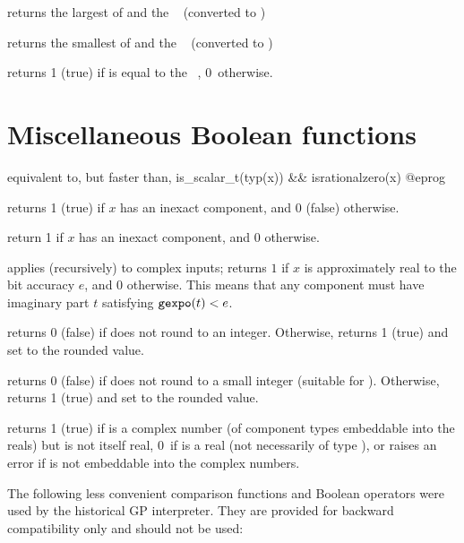 
 returns the largest of  and
the ~ (converted to )


 returns the smallest of  and the
~ (converted to )


 returns 1 (true) if  is equal to
the ~, 0~otherwise.

\section{Miscellaneous Boolean functions}

 equivalent to, but faster than,
\bprog
  is_scalar_t(typ(x)) && isrationalzero(x)
@eprog

 returns 1 (true) if $x$ has an inexact
component, and 0 (false) otherwise.

 return 1 if $x$ has an inexact
 component, and 0  otherwise.

 applies (recursively) to complex inputs;
returns $1$ if $x$ is approximately real to the bit accuracy $e$, and 0
otherwise. This means that any  component must have imaginary part
$t$ satisfying ${\tt gexpo}(t) < e$.

 returns 0 (false) if  does not round
to an integer. Otherwise, returns 1 (true) and set  to the rounded
value.

 returns 0 (false) if  does not
round to a small integer (suitable for ). Otherwise, returns 1
(true) and set  to the rounded value.

 returns 1 (true) if  is a complex number
(of component types embeddable into the reals) but is not itself real, 0~if
 is a real (not necessarily of type ), or raises an error if
 is not embeddable into the complex numbers.


The following less convenient comparison functions and Boolean operators were
used by the historical GP interpreter. They are provided for backward
compatibility only and should not be used:

